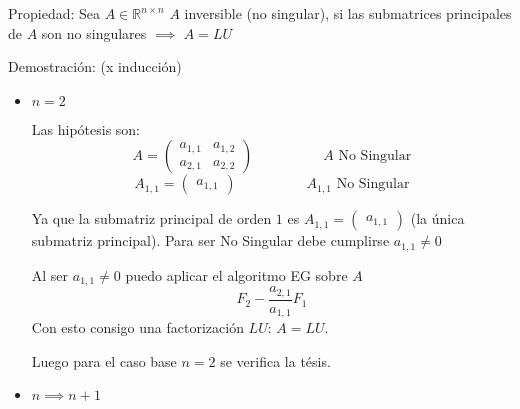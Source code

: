 Propiedad: Sea $A \in \mathbb{R}^{n \times n}$ $A$ inversible (no singular), si las submatrices principales de $A$ son no singulares $\implies$ $A = L U$

Demostración: (x inducción)

\begin{itemize}
	\item $n = 2$
	
	Las hipótesis son:
	\[ A = \begin{pmatrix} a_{1,1} & a_{1,2} \\ a_{2,1} & a_{2,2} \end{pmatrix} \hspace{5em}A \text{ No Singular}\]
	\[ A_{1,1} = \begin{pmatrix} a_{1,1} \end{pmatrix} \hspace{5em}A_{1,1} \text{ No Singular} \]
	
	Ya que la submatriz principal de orden $1$ es $ A_{1,1} = \begin{pmatrix} a_{1,1} \end{pmatrix} $ (la única submatriz principal). Para ser No Singular debe cumplirse $a_{1,1} \neq 0$
	
	Al ser $a_{1,1} \neq 0$ puedo aplicar el algoritmo EG sobre $A$
	\[F_2 - \frac{a_{2,1}}{a_{1,1}} F_1 \]
	Con esto consigo una factorización $LU$: $A = LU$.
	
	Luego para el caso base $n = 2$ se verifica la tésis.
	
	\item $n \implies n+1$
	

\end{itemize}
